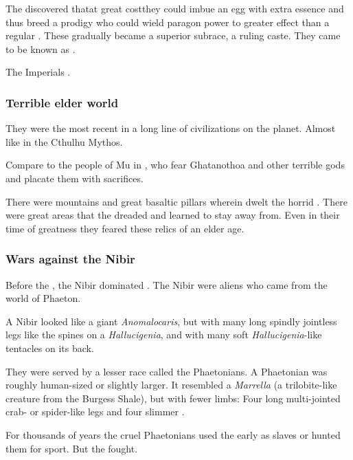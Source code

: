 The \ophidians discovered that\dash at great cost\dash they could imbue an egg with extra essence and thus breed a prodigy who could wield paragon power to greater effect than a regular \ophidian. 
These  gradually became a superior subrace, a ruling caste. 
They came to be known as .

The \ophidian Imperials . 





\subsubsection{Terrible elder world}
They were the most recent in a long line of civilizations on the planet. 
Almost like \humans in the Cthulhu Mythos. 

Compare to the people of Mu in \cite{HPLovecraft:OutoftheAeons}, who fear Ghatanothoa and other terrible gods and placate them with sacrifices. 

There were mountains and great basaltic pillars wherein dwelt the horrid . 
There were great areas that the \ophidians dreaded and learned to stay away from.
Even in their time of greatness they feared these relics of an elder age. 





\subsubsection{Wars against the Nibir}
Before the \ophidians, the Nibir dominated \Miith. 
The Nibir were aliens who came from the world of Phaeton. 

A Nibir looked like a giant \emph{Anomalocaris}, but with many long spindly jointless legs like the spines on a \emph{Hallucigenia}, and with many soft \emph{Hallucigenia}-like tentacles on its back. 

They were served by a lesser race called the Phaetonians. 
A Phaetonian was roughly human-sized or slightly larger. 
It resembled a \emph{Marrella} (a trilobite-like creature from the Burgess Shale), but with fewer limbs: 
Four long multi-jointed crab- or spider-like legs and four slimmer . 

For thousands of years the cruel Phaetonians used the early \ophidians as slaves or hunted them for sport. 
But the \ophidians fought. 

